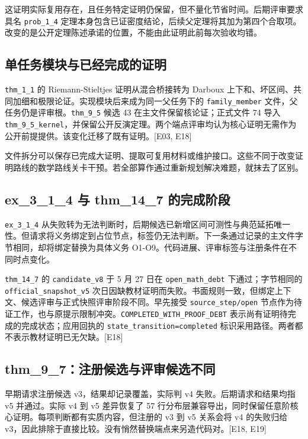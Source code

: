 这证明实际复用存在，且任务特定证明仍保留，但不量化节省时间。后期评审要求具名 \nolinkurl{prob_1_4} 定理本身包含已证密度结论，后续父定理将其加为第四个合取项。改变的是公开定理陈述承诺的位置，不能由此证明此前每次验收均错。

\subsection[单任务模块与已经完成的证明]{\texorpdfstring{\protect\hypertarget{b5}{}单任务模块与已经完成的证明}{单任务模块与已经完成的证明}}
\nolinkurl{thm_1_1} 的 Riemann-Stieltjes 证明从混合桥接转为 Darboux 上下和、坏区间、共同加细和极限论证。实现模块后来成为同一父任务下的 \nolinkurl{family_member} 文件，父任务仍是评审根。\nolinkurl{thm_9_5} 候选 43 在主文件保留核论证；正式文件 74 导入 \nolinkurl{thm_9_5_kernel}，并保留公开反演定理。两个端点评审均认为核心证明无需作为公开前提提供。该变化迁移了既有证明。[E03, E18]

文件拆分可以保存已完成大证明、提取可复用材料或维护接口。这些不同于改变证明路线的数学路线关卡干预。若全部算作通过重新规划解决难题，就抹去了区别。

\subsection[ex\_3\_1\_4 与 thm\_14\_7 的完成阶段]{\texorpdfstring{\protect\hypertarget{b6}{}ex\_3\_1\_4 与 thm\_14\_7 的完成阶段}{ex\_3\_1\_4 与 thm\_14\_7 的完成阶段}}
\nolinkurl{ex_3_1_4} 从失败转为无法判断时，后期候选已新增区间可测性与典范延拓唯一性。但请求将义务绑定到占位节点，标签仍无法判断。下一条通过记录的主文件字节相同，却将绑定替换为具体义务 O1-O9。代码进展、评审标签与注册条件在不同时点变化。

\nolinkurl{thm_14_7} 的 \nolinkurl{candidate_v8} 于 5 月 27 日在 \nolinkurl{open_math_debt} 下通过；字节相同的 \nolinkurl{official_snapshot_v5} 次日因缺教材证明而失败。书面规则一致，但绑定上下文、候选评审与正式快照评审阶段不同。早先接受 \nolinkurl{source_step/open} 节点作为待证工作，也与原提示限制冲突。\nolinkurl{COMPLETED_WITH_PROOF_DEBT} 表示尚有证明待完成的完成状态；应用回执的 \nolinkurl{state_transition=completed} 标识采用路径。两者都不表示教材证明已无欠缺。[E18]

\subsection[thm\_9\_7：注册候选与评审候选不同]{\texorpdfstring{\protect\hypertarget{b7}{}thm\_9\_7：注册候选与评审候选不同}{thm\_9\_7：注册候选与评审候选不同}}
早期请求注册候选 v3，结果却记录覆盖，实际判 v4 失败。后期请求和结果均指 v5 并通过。实际 v4 到 v5 差异恢复了 57 行分布层兼容导出，同时保留任意阶核心证明。每项判断都有实质内容，但注册的 v3 到 v5 关系会将 v4 的失败归给 v3，因此排除于直接比较。没有悄然替换端点来另造代码对。[E18, E19]

